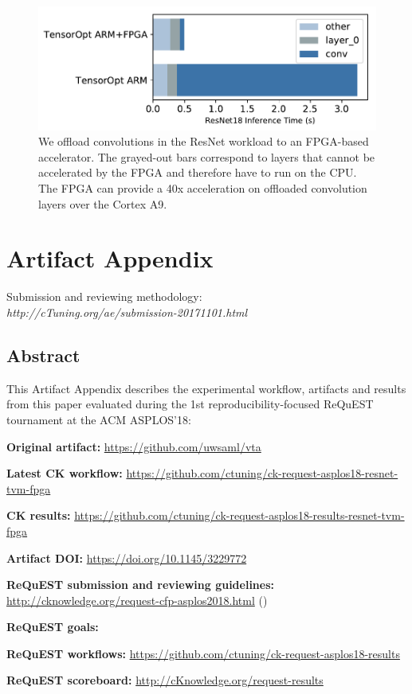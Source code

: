 \documentclass[sigconf]{acmart}
\newenvironment{packed_itemize}{
\begin{itemize}
  \setlength{\itemsep}{1pt}
  \setlength{\parskip}{0pt}
  \setlength{\parsep}{0pt}
}{\end{itemize}}
\begin{document}
\begin{figure}[t]
\centering
\includegraphics[width=0.9\columnwidth]{figures/exp_fpga_e2e}
\caption{\small{We offload convolutions in the ResNet workload to an FPGA-based accelerator.
The grayed-out bars correspond to layers that cannot be accelerated by the FPGA and therefore have to run on the CPU. The FPGA can provide a 40x acceleration on offloaded convolution layers over the Cortex A9.}}
\label{fig:e2e_fpga}
\end{figure}




\newpage

\onecolumn

\appendix
\section{Artifact Appendix}

Submission and reviewing methodology: \\
{\em http://cTuning.org/ae/submission-20171101.html}

\subsection{Abstract}

This Artifact Appendix describes the experimental workflow,
artifacts and results from this paper evaluated 
during the 1st reproducibility-focused ReQuEST tournament at the ACM ASPLOS'18:

\begin{packed_itemize}
  \item {\bf Original artifact:} \url{https://github.com/uwsaml/vta}
  \item {\bf Latest CK workflow:} \url{https://github.com/ctuning/ck-request-asplos18-resnet-tvm-fpga}
  \item {\bf CK results:} \url{https://github.com/ctuning/ck-request-asplos18-results-resnet-tvm-fpga}
  \item {\bf Artifact DOI:} \url{https://doi.org/10.1145/3229772}
  \item {\bf ReQuEST submission and reviewing guidelines:} \url{http://cknowledge.org/request-cfp-asplos2018.html} (\cite{request-asplos18})
  \item {\bf ReQuEST goals:} \cite{cm:29db2248aba45e59:0c7348dfbadd5b95}
  \item {\bf ReQuEST workflows:} \url{https://github.com/ctuning/ck-request-asplos18-results}
  \item {\bf ReQuEST scoreboard:} \url{http://cKnowledge.org/request-results}
\end{packed_itemize}
\end{document}
